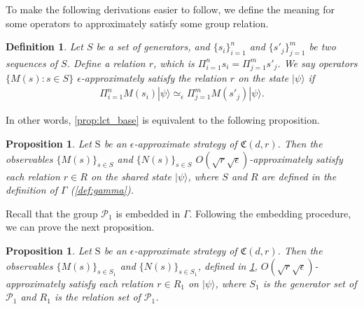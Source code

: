 \documentclass[11pt,letterpaper]{article}
\newcommand{\ket}[1]{|#1\rangle}
\newcommand{\1}{\mathbb{1}}
\newcommand{\Pg}{\mathcal{P}}
\newcommand{\fC}{\mathfrak{C}}
\newcommand{\bS}{\mathrm{S}}
\newcommand{\ep}{\epsilon}
\newcommand{\se}{\sqrt{\epsilon}}
\newcommand{\sr}{\sqrt{r}}
\newcommand{\appd}[1]{\simeq_{#1}}
\newtheorem{proposition}[theorem]{Proposition}
\newtheorem{definition}[theorem]{Definition}
\theoremstyle{definition}
\begin{document}
To make the following derivations easier to follow, we define the meaning
for some operators to approximately satisfy some group relation.
\begin{definition}
    Let $S$ be a set of generators, and $\{s_i\}_{i=1}^n$ and $\{s'_j\}_{j=1}^m$
    be two sequences of $S$.
    Define a relation $r$, which is $\Pi_{i=1}^n s_i = \Pi_{j=1}^m s'_j$.
    We say operators $\{M(s) : s \in S\}$ $\ep$-approximately satisfy the relation
    $r$ on the state $\ket{\psi}$ if 
    \begin{align*}
        \Pi_{i=1}^n M(s_i)\ket{\psi} \appd{\ep} \Pi_{j=1}^m M(s'_j) \ket{\psi}. 
    \end{align*}
\end{definition}
In other words, \cref{prop:lct_base} is equivalent to the following proposition.
\begin{proposition}
    \label{prop:lct_group}
    Let $\bS$ be an $\ep$-approximate strategy of $\fC(d,r)$.
	Then the observables $\{ M(s) \}_{s \in S}$ and
	$\{N(s)\}_{s \in S}$ $O(\sr \se)$-approximately satisfy
	each relation $r \in R$ on the shared state $\ket{\psi}$, 
	where $S$ and $R$ are defined in the definition of $\Gamma$ 
	(\cref{def:gamma}).	
\end{proposition}
Recall that the group $\Pg_1$ is embedded in $\Gamma$.
Following the embedding procedure, we can prove the next proposition.
\begin{proposition}
    \label{prop:lct_pg1}
    Let $\bS$ be an $\ep$-approximate strategy of $\fC(d,r)$.
	Then the observables $\{ M(s) \}_{s \in S_1}$ and
	$\{N(s)\}_{s \in S_1}$, defined in 
\cref{prop:lct_group}, $O(\sr\se)$-approximately satisfy
	each relation $r \in R_1$ on $\ket{\psi}$, 
	where $S_1$ is the generator set of $\Pg_1$
    and $R_1$ is the relation set of $\Pg_1$.	
\end{proposition}
\end{document}
